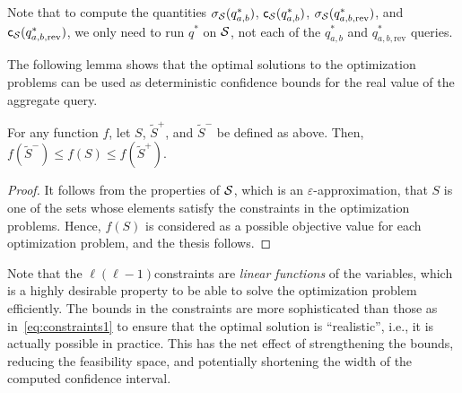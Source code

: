 Note that to compute the quantities $\sigma_{\cal S}(q^*_{a,b})$,
$\mathsf{c}_{\cal S}(q^*_{a,b})$, $\sigma_{\cal S}(q^*_{a,b,\mathrm{rev}})$, and
$\mathsf{c}_{\cal S}(q^*_{a,b,\mathrm{rev}})$, we only need to run $q^*$ on ${\cal S}$, not
each of the $q^*_{a,b}$ and $q^*_{a,b,\mathrm{rev}}$ queries.

The following lemma shows that the optimal solutions to the optimization problems
can be used as deterministic confidence bounds for the real value of the
aggregate query.

\begin{lemma}\label{lem:confbounds}
  For any function $f$, let $S$, $\tilde{S}^+$, and $\tilde{S}^-$ be defined as
  above. Then, $f(\tilde{S}^-)\le f(S)\le f(\tilde{S}^+)$.
\end{lemma}
\begin{proof}
  It follows from the properties of ${\cal S}$, which is an
  $\varepsilon$-approximation, that $S$ is one of the sets whose elements
  satisfy the constraints in the optimization problems. Hence, $f(S)$ is
  considered as a possible objective value for  each optimization problem, and
  the thesis follows.
\end{proof}

Note that the $\ell(\ell-1)$constraints are \emph{linear functions} of the
variables, which is a highly desirable property to be able to solve the
optimization problem efficiently. The bounds in the constraints are more
sophisticated than those as in~\eqref{eq:constraints1} to ensure that the
optimal solution is ``realistic'', i.e., it is actually possible in practice.
This has the net effect of strengthening the bounds, reducing the feasibility
space, and potentially shortening the width of the computed confidence interval.

